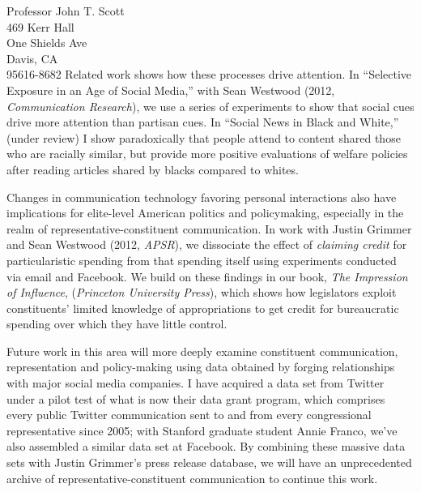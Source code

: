 \documentclass[fontsize=12pt, paper=a4]{scrlttr2}
\begin{document}
\begin{letter}{Professor John T. Scott\\
469 Kerr Hall\\
One Shields Ave\\
Davis, CA\\
95616-8682}
Related work shows how these processes drive attention. In ``Selective Exposure in an Age of Social Media,'' with Sean Westwood (2012, \emph{Communication Research}), we use a series of experiments to show that social cues drive more attention than partisan cues.  %
In ``Social News in Black and White,'' (under review) I show paradoxically that people attend to content shared those who are racially similar, but provide more positive evaluations of welfare policies after reading articles shared by blacks compared to whites.  

Changes in communication technology favoring personal interactions also have implications for elite-level American politics and policymaking, especially in the realm of representative-constituent communication.  In work with Justin Grimmer and Sean Westwood (2012, \emph{APSR}), we dissociate the effect of \emph{claiming credit} for particularistic spending from that spending itself using  experiments conducted via email and Facebook.  %
We build on these findings in our book, \emph{The Impression of Influence}, (\emph{Princeton University Press}), which shows how legislators exploit constituents' limited knowledge of appropriations to get credit for bureaucratic spending over which they have little control.  

Future work in this area will more deeply examine constituent communication, representation and policy-making using data obtained by forging relationships with major social media companies.  I have acquired a data set from Twitter under a pilot test of what is now their data grant program, which comprises every public Twitter communication sent to and from every congressional representative since 2005; with Stanford graduate student Annie Franco, we've also assembled a similar data set at Facebook.  By combining these massive data sets with Justin Grimmer's press release database, we will have an unprecedented archive of representative-constituent communication to continue this work.


\end{letter}
\end{document}
